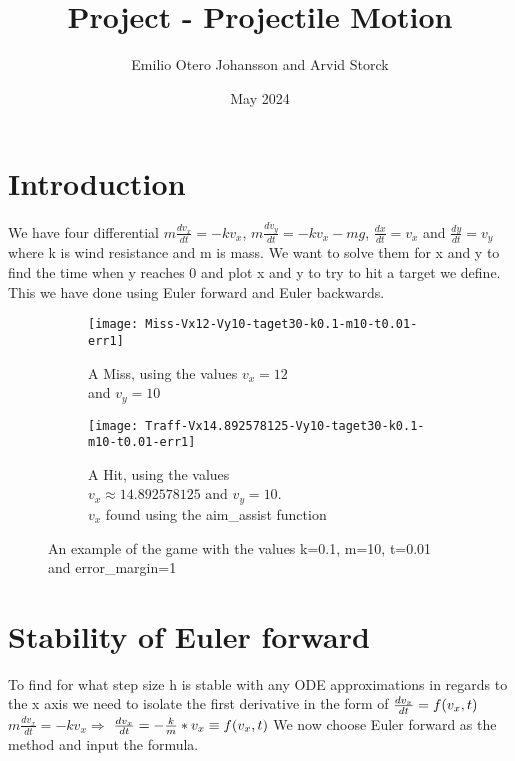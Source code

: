 \documentclass{article}
\title{Project - Projectile Motion}
\author{Emilio Otero Johansson and Arvid Storck}
\date{May 2024}
\begin{document}
\maketitle
\section{Introduction}
We have four differential $m\frac{dv_x}{dt}=-kv_x$, $m\frac{dv_y}{dt}=-kv_x-mg$, $\frac{dx}{dt}=v_x$ and $\frac{dy}{dt}=v_y$ where k is wind resistance and m is mass. We want to solve them for x and y to find the time when y reaches 0 and plot x and y to try to hit a target we define. This we have done using Euler forward and Euler backwards.

\begin{figure}[h]

\begin{subfigure}{0.49\textwidth}
\texttt{[image: Miss-Vx12-Vy10-taget30-k0.1-m10-t0.01-err1]} 
\caption{A Miss, using the values $v_x=12$\\ and $v_y=10$\\ }
\label{fig:subim1}
\end{subfigure}
\begin{subfigure}{0.49\textwidth}
\texttt{[image: Traff-Vx14.892578125-Vy10-taget30-k0.1-m10-t0.01-err1]}
\caption{A Hit, using the values\\ $v_x\approx14.892578125$ and $v_y=10$.\\$v_x$ found using the aim\_assist function}
\label{fig:subim2}
\end{subfigure}

\caption{An example of the game with the values k=0.1, m=10, t=0.01\\ and error\_margin=1}
\label{fig:image2}
\end{figure}

\section{Stability of Euler forward}

To find for what step size h is stable with any ODE approximations in regards to the x axis we need to isolate the first derivative in the form of $\frac{dv_x}{dt}=f(v_x,t)\newline\newline$
$m\frac{dv_x}{dt}=-kv_x\Rightarrow$
$\frac{dv_x}{dt}=-\frac{k}{m}*v_x\equiv f(v_x,t)\newline\newline$
We now choose Euler forward as the method and input the formula.
\end{document}
